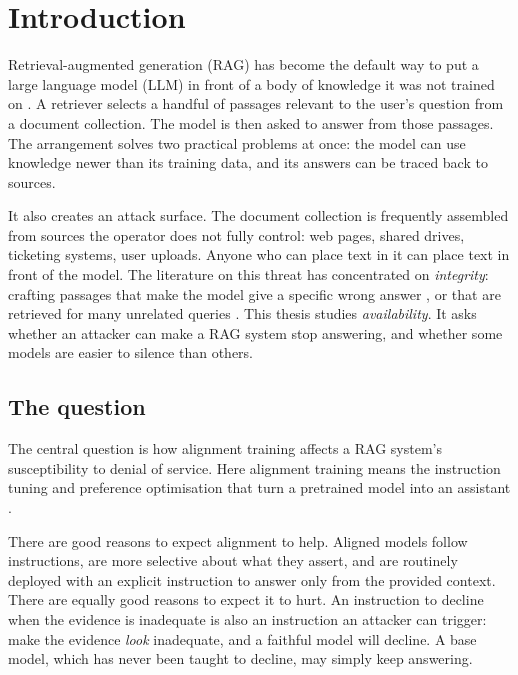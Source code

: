 \chapter{Introduction}
\label{ch:intro}

Retrieval-augmented generation (RAG) has become the default way to put a large
language model (LLM) in front of a body of knowledge it was not trained on
\cite{lewis2020rag}. A retriever selects a handful of passages relevant to the
user's question from a document collection. The model is then asked to answer
from those passages. The arrangement solves two practical problems at once: the
model can use knowledge newer than its training data, and its answers can be
traced back to sources.

It also creates an attack surface. The document collection is frequently
assembled from sources the operator does not fully control: web pages, shared
drives, ticketing systems, user uploads. Anyone who can place text in it can
place text in front of the model. The literature on this threat has
concentrated on \emph{integrity}: crafting passages that make the model give a
specific wrong answer \cite{zou2025poisonedrag}, or that are retrieved for many
unrelated queries \cite{zhong2023poisoning}. This thesis studies
\emph{availability}. It asks whether an attacker can make a RAG system stop
answering, and whether some models are easier to silence than others.

\section{The question}
\label{sec:question}

The central question is how alignment training affects a RAG system's
susceptibility to denial of service. Here alignment training means the
instruction tuning and preference optimisation that turn a pretrained
model into an assistant \cite{ouyang2022instructgpt,wei2022flan}.

There are good reasons to expect alignment to help. Aligned models follow
instructions, are more selective about what they assert, and are routinely
deployed with an explicit instruction to answer only from the provided context.
There are equally good reasons to expect it to hurt. An instruction to decline
when the evidence is inadequate is also an instruction an attacker can trigger:
make the evidence \emph{look} inadequate, and a faithful model will decline.
A base model, which has never been taught to decline, may simply keep
answering.

